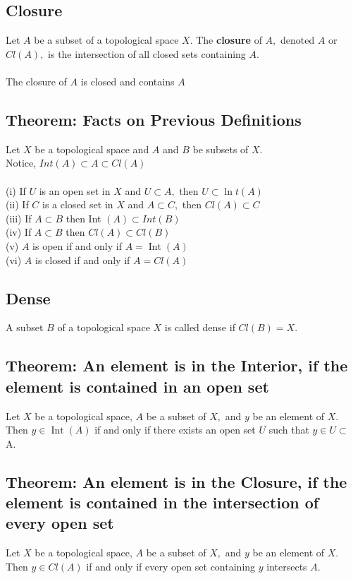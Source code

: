 \documentclass[12pt]{article}
\begin{document}
	\subsection{Closure} 
		Let $ A $ be a subset of a topological space $X .$  The \textbf{closure} of $A ,$ denoted $A$ or $C l ( A ) ,$ is the intersection of all closed sets containing $A .$\\
		\\
		The closure of $ A $ is closed and contains $ A $
	\subsection{Theorem: Facts on Previous Definitions}
		Let $X$ be a topological space and $A$ and $B$ be subsets of $X .$\\
		Notice, $ Int(A) \subset A \subset Cl(A) $\\
		\\
		(i) If $U$ is an open set in $X$ and $U \subset A ,$ then $U \subset \ln t ( A )$\\
		(ii) If $C$ is a closed set in $X$ and $A \subset C ,$ then $C l ( A ) \subset C$\\
		(iii) If $A \subset B$ then Int $( A ) \subset Int( B )$\\
		(iv) If $A \subset B$ then $Cl ( A ) \subset Cl ( B )$\\
		(v) $A$ is open if and only if $A = \operatorname { Int } ( A )$\\
		(vi) $A$ is closed if and only if $A = C l ( A )$
	\subsection{Dense}
		A subset $ B $ of a topological space $X$ is called dense if
		$Cl(B) = X .$
	\subsection{Theorem: An element is in the Interior, if the element is contained in an open set}
		Let $X$ be a topological space, $A$ be a subset of $X ,$ and $y$ be an element of $X .$ Then $y \in \operatorname { Int } ( A )$ if and only if there exists an open set $U$ such
		that $y \in U \subset$ A.
	\subsection{Theorem: An element is in the Closure, if the element is contained in the intersection of every open set}
		Let $X$ be a topological space, $A$ be a subset of $X ,$ and $y$ be an element of $X .$ Then $y \in Cl( A )$ if and only if every open set containing $y$ intersects $A .$
\end{document}
